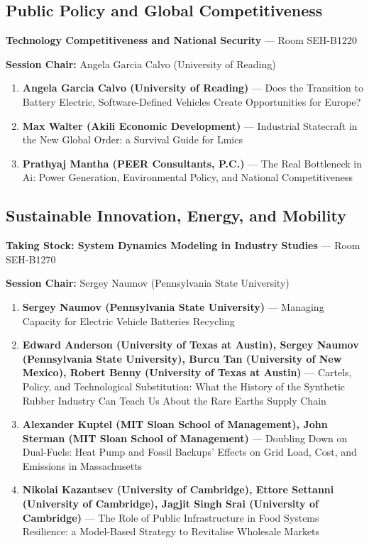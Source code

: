 \documentclass[
  10pt,
  letterpaper,
  DIV=11,
  numbers=noendperiod]{scrartcl}
\begin{document}
\subsection{\texorpdfstring{\textcolor{policy}{Public Policy and Global Competitiveness}}{}}\label{section-5}

\textbf{Technology Competitiveness and National Security} --- Room
SEH-B1220

\textbf{Session Chair:} Angela Garcia Calvo (University of Reading)

\begin{enumerate}
\def\labelenumi{\arabic{enumi}.}
\item
  \textbf{Angela Garcia Calvo (University of Reading)} --- Does the
  Transition to Battery Electric, Software-Defined Vehicles Create
  Opportunities for Europe?
\item
  \textbf{Max Walter (Akili Economic Development)} --- Industrial
  Statecraft in the New Global Order: a Survival Guide for Lmics
\item
  \textbf{Prathyaj Mantha (PEER Consultants, P.C.)} --- The Real
  Bottleneck in Ai: Power Generation, Environmental Policy, and National
  Competitiveness
\end{enumerate}

\subsection{\texorpdfstring{\textcolor{sustainability}{Sustainable Innovation, Energy, and Mobility}}{}}\label{section-6}

\textbf{Taking Stock: System Dynamics Modeling in Industry Studies} ---
Room SEH-B1270

\textbf{Session Chair:} Sergey Naumov (Pennsylvania State University)

\begin{enumerate}
\def\labelenumi{\arabic{enumi}.}
\item
  \textbf{Sergey Naumov (Pennsylvania State University)} --- Managing
  Capacity for Electric Vehicle Batteries Recycling
\item
  \textbf{Edward Anderson (University of Texas at Austin), Sergey Naumov
  (Pennsylvania State University), Burcu Tan (University of New Mexico),
  Robert Benny (University of Texas at Austin)} --- Cartels, Policy, and
  Technological Substitution: What the History of the Synthetic Rubber
  Industry Can Teach Us About the Rare Earths Supply Chain
\item
  \textbf{Alexander Kuptel (MIT Sloan School of Management), John
  Sterman (MIT Sloan School of Management)} --- Doubling Down on
  Dual-Fuels: Heat Pump and Fossil Backups' Effects on Grid Load, Cost,
  and Emissions in Massachusetts
\item
  \textbf{Nikolai Kazantsev (University of Cambridge), Ettore Settanni
  (University of Cambridge), Jagjit Singh Srai (University of
  Cambridge)} --- The Role of Public Infrastructure in Food Systems
  Resilience: a Model-Based Strategy to Revitalise Wholesale Markets
\end{enumerate}
\end{document}
